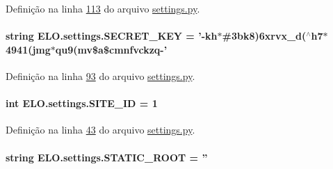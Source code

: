 Definição na linha \hyperlink{settings_8py_source_l00113}{113} do arquivo \hyperlink{settings_8py_source}{settings.\-py}.

\hypertarget{namespaceELO_1_1settings_a13a984a190c7599ab7343322ab098d6d}{
\paragraph[{S\-E\-C\-R\-E\-T\-\_\-\-K\-E\-Y}]{\setlength{\rightskip}{0pt plus 5cm}string E\-L\-O.\-settings.\-S\-E\-C\-R\-E\-T\-\_\-\-K\-E\-Y = '-\/kh$\ast$\#3bk8)6xrvx\-\_\-d($^\wedge$h7$\ast$4941(jmg$\ast$qu9(mv\$a\$cmnfvckzq-\/'}}\label{namespaceELO_1_1settings_a13a984a190c7599ab7343322ab098d6d}


Definição na linha \hyperlink{settings_8py_source_l00093}{93} do arquivo \hyperlink{settings_8py_source}{settings.\-py}.

\hypertarget{namespaceELO_1_1settings_a31328123344da3768e97b0ac61c342de}{
\paragraph[{S\-I\-T\-E\-\_\-\-I\-D}]{\setlength{\rightskip}{0pt plus 5cm}int E\-L\-O.\-settings.\-S\-I\-T\-E\-\_\-\-I\-D = 1}}\label{namespaceELO_1_1settings_a31328123344da3768e97b0ac61c342de}


Definição na linha \hyperlink{settings_8py_source_l00043}{43} do arquivo \hyperlink{settings_8py_source}{settings.\-py}.

\hypertarget{namespaceELO_1_1settings_ae5539527ada0171fc602c561493398f4}{
\paragraph[{S\-T\-A\-T\-I\-C\-\_\-\-R\-O\-O\-T}]{\setlength{\rightskip}{0pt plus 5cm}string E\-L\-O.\-settings.\-S\-T\-A\-T\-I\-C\-\_\-\-R\-O\-O\-T = ''}}\label{namespaceELO_1_1settings_ae5539527ada0171fc602c561493398f4}


